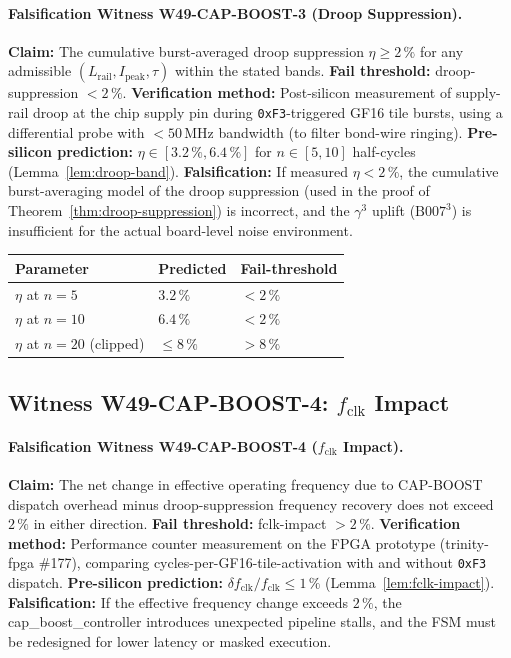 \documentclass[12pt,a4paper]{report}
\theoremstyle{plain}
\theoremstyle{definition}
\theoremstyle{remark}
\newcommand{\Lrail}{L_{\mathrm{rail}}}
\newcommand{\Ipeak}{I_{\mathrm{peak}}}
\newcommand{\fclk}{f_{\mathrm{clk}}}
\newcommand{\Bseven}{\mathrm{B007}}
\begin{document}
\paragraph{Falsification Witness W49-CAP-BOOST-3 (Droop Suppression).}
\label{fw:3}
\textbf{Claim:} The cumulative burst-averaged droop suppression $\eta \geq 2\,\%$
for any admissible $(\Lrail, \Ipeak, \tau)$ within the stated bands.
\textbf{Fail threshold:} droop-suppression $< 2\,\%$.
\textbf{Verification method:} Post-silicon measurement of supply-rail droop
at the chip supply pin during \texttt{0xF3}-triggered GF16 tile bursts,
using a differential probe with $< 50\,\mathrm{MHz}$ bandwidth (to filter
bond-wire ringing).
\textbf{Pre-silicon prediction:} $\eta \in [3.2\,\%, 6.4\,\%]$ for
$n \in [5, 10]$ half-cycles (Lemma~\ref{lem:droop-band}).
\textbf{Falsification:} If measured $\eta < 2\,\%$, the cumulative
burst-averaging model of the droop suppression (used in the proof of
Theorem~\ref{thm:droop-suppression}) is incorrect, and the
$\gamma^{3}$ uplift ($\Bseven^{3}$) is insufficient for the actual
board-level noise environment.

\begin{center}
\begin{tabular}{lll}
  \toprule
  Parameter & Predicted & Fail-threshold \\
  \midrule
  $\eta$ at $n = 5$ & $3.2\,\%$ & $< 2\,\%$ \\
  $\eta$ at $n = 10$ & $6.4\,\%$ & $< 2\,\%$ \\
  $\eta$ at $n = 20$ (clipped) & $\leq 8\,\%$ & $> 8\,\%$ \\
  \bottomrule
\end{tabular}
\end{center}

\subsection{Witness W49-CAP-BOOST-4: $\fclk$ Impact}

\paragraph{Falsification Witness W49-CAP-BOOST-4 ($\fclk$ Impact).}
\label{fw:4}
\textbf{Claim:} The net change in effective operating frequency due to
CAP-BOOST dispatch overhead minus droop-suppression frequency recovery
does not exceed $2\,\%$ in either direction.
\textbf{Fail threshold:} fclk-impact $> 2\,\%$.
\textbf{Verification method:} Performance counter measurement on the
FPGA prototype (trinity-fpga \#177), comparing cycles-per-GF16-tile-activation
with and without \texttt{0xF3} dispatch.
\textbf{Pre-silicon prediction:} $\delta \fclk / \fclk \leq 1\,\%$
(Lemma~\ref{lem:fclk-impact}).
\textbf{Falsification:} If the effective frequency change exceeds $2\,\%$,
the cap\_boost\_controller introduces unexpected pipeline stalls, and the
FSM must be redesigned for lower latency or masked execution.
\end{document}
